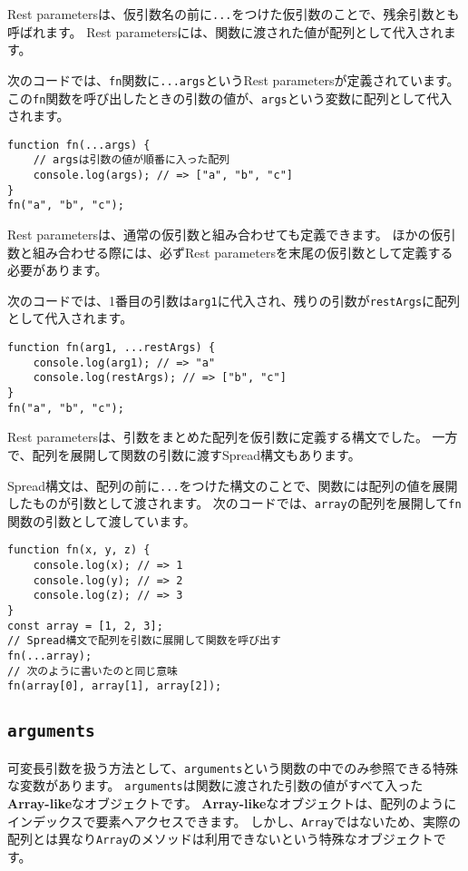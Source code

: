 Rest
parametersは、仮引数名の前に\texttt{...}をつけた仮引数のことで、残余引数とも呼ばれます。
Rest parametersには、関数に渡された値が配列として代入されます。

次のコードでは、\texttt{fn}関数に\texttt{...args}というRest
parametersが定義されています。
この\texttt{fn}関数を呼び出したときの引数の値が、\texttt{args}という変数に配列として代入されます。

\begin{lstlisting}
function fn(...args) {
    // argsは引数の値が順番に入った配列
    console.log(args); // => ["a", "b", "c"]
}
fn("a", "b", "c");
\end{lstlisting}

Rest parametersは、通常の仮引数と組み合わせても定義できます。
ほかの仮引数と組み合わせる際には、必ずRest
parametersを末尾の仮引数として定義する必要があります。

次のコードでは、1番目の引数は\texttt{arg1}に代入され、残りの引数が\texttt{restArgs}に配列として代入されます。

\begin{lstlisting}
function fn(arg1, ...restArgs) {
    console.log(arg1); // => "a"
    console.log(restArgs); // => ["b", "c"]
}
fn("a", "b", "c");
\end{lstlisting}

Rest parametersは、引数をまとめた配列を仮引数に定義する構文でした。
一方で、配列を展開して関数の引数に渡すSpread構文もあります。

Spread構文は、配列の前に\texttt{...}をつけた構文のことで、関数には配列の値を展開したものが引数として渡されます。
次のコードでは、\texttt{array}の配列を展開して\texttt{fn}関数の引数として渡しています。

\begin{lstlisting}
function fn(x, y, z) {
    console.log(x); // => 1 
    console.log(y); // => 2 
    console.log(z); // => 3 
}
const array = [1, 2, 3];
// Spread構文で配列を引数に展開して関数を呼び出す
fn(...array);
// 次のように書いたのと同じ意味
fn(array[0], array[1], array[2]);
\end{lstlisting}

\hypertarget{arguments}{%
\subsection{\texorpdfstring{\texttt{arguments}}{arguments}}\label{arguments}}

可変長引数を扱う方法として、\texttt{arguments}という関数の中でのみ参照できる特殊な変数があります。
\texttt{arguments}は関数に渡された引数の値がすべて入った\textbf{Array-like}なオブジェクトです。
\textbf{Array-like}なオブジェクトは、配列のようにインデックスで要素へアクセスできます。
しかし、\texttt{Array}ではないため、実際の配列とは異なり\texttt{Array}のメソッドは利用できないという特殊なオブジェクトです。

